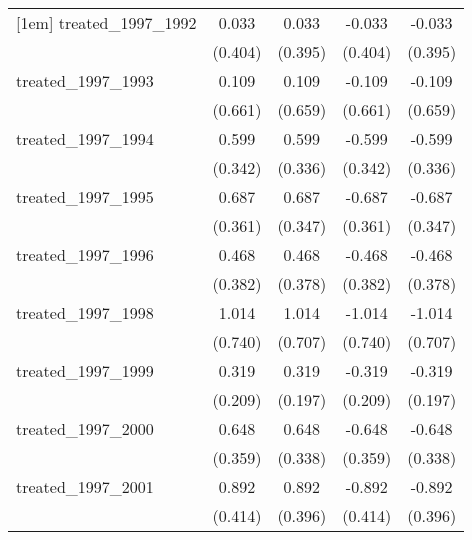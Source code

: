 {\begin{tabular}{l*{4}{c}}
[1em]
treated\_1997\_1992&       0.033         &       0.033         &      -0.033         &      -0.033         \\
            &     (0.404)         &     (0.395)         &     (0.404)         &     (0.395)         \\
[1em]
treated\_1997\_1993&       0.109         &       0.109         &      -0.109         &      -0.109         \\
            &     (0.661)         &     (0.659)         &     (0.661)         &     (0.659)         \\
[1em]
treated\_1997\_1994&       0.599         &       0.599         &      -0.599         &      -0.599         \\
            &     (0.342)         &     (0.336)         &     (0.342)         &     (0.336)         \\
[1em]
treated\_1997\_1995&       0.687         &       0.687\sym{*}  &      -0.687         &      -0.687\sym{*}  \\
            &     (0.361)         &     (0.347)         &     (0.361)         &     (0.347)         \\
[1em]
treated\_1997\_1996&       0.468         &       0.468         &      -0.468         &      -0.468         \\
            &     (0.382)         &     (0.378)         &     (0.382)         &     (0.378)         \\
[1em]
treated\_1997\_1998&       1.014         &       1.014         &      -1.014         &      -1.014         \\
            &     (0.740)         &     (0.707)         &     (0.740)         &     (0.707)         \\
[1em]
treated\_1997\_1999&       0.319         &       0.319         &      -0.319         &      -0.319         \\
            &     (0.209)         &     (0.197)         &     (0.209)         &     (0.197)         \\
[1em]
treated\_1997\_2000&       0.648         &       0.648         &      -0.648         &      -0.648         \\
            &     (0.359)         &     (0.338)         &     (0.359)         &     (0.338)         \\
[1em]
treated\_1997\_2001&       0.892\sym{*}  &       0.892\sym{*}  &      -0.892\sym{*}  &      -0.892\sym{*}  \\
            &     (0.414)         &     (0.396)         &     (0.414)         &     (0.396)         \\

\end{tabular}}
